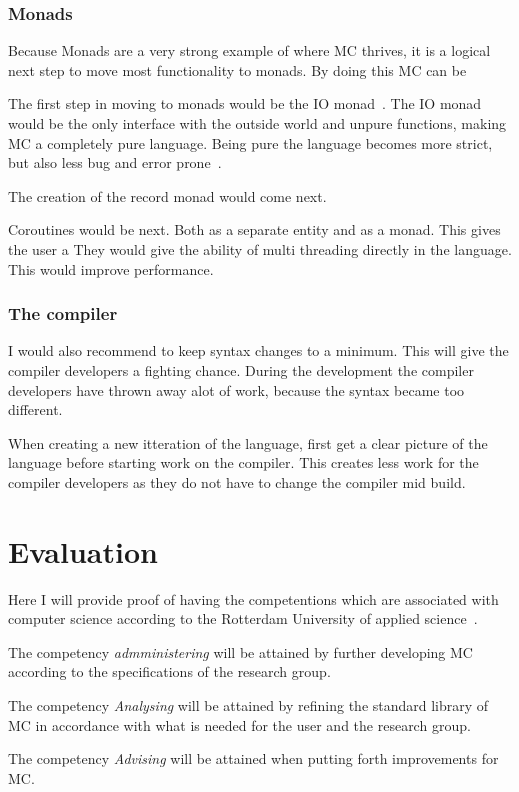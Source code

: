 \subsection{Monads}
Because Monads are a very strong example of where MC thrives, it is a logical next step to move most functionality to monads.
By doing this MC can be

The first step in moving to monads would be the IO monad~\cite{iomonad}.
The IO monad would be the only interface with the outside world and unpure functions, making MC a completely pure language.
Being pure the language becomes more strict, but also less bug and error prone~\cite{purelanguage}.


The creation of the record monad would come next.

Coroutines would be next.
Both as a separate entity and as a monad.
This gives the user a
They would give the ability of multi threading directly in the language.
This would improve performance.

\subsection{The compiler}
I would also recommend to keep syntax changes to a minimum.
This will give the compiler developers a fighting chance.
During the development the compiler developers have thrown away alot of work, because the syntax became too different.

When creating a new itteration of the language, first get a clear picture of the language before starting work on the compiler.
This creates less work for the compiler developers as they do not have to change the compiler mid build.



\chapter{Evaluation}
Here I will provide proof of having the competentions which are associated with computer science according to the Rotterdam University of applied science~\cite{citeershit}.

The competency \emph{admministering} will be attained by further developing MC according to the specifications of the research group.

The competency \emph{Analysing} will be attained by refining the standard library of MC in accordance with what is needed for the user and the research group.

The competency \emph{Advising} will be attained when putting forth improvements for MC.

